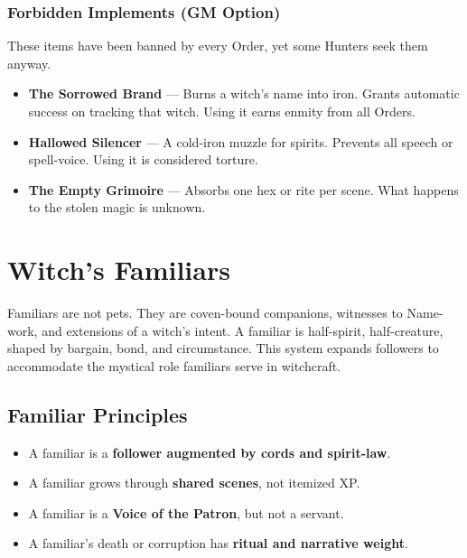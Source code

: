 \documentclass[11pt]{book}
\begin{document}
\subsubsection*{Forbidden Implements (GM Option)}
These items have been banned by every Order, yet some Hunters seek them anyway.

\begin{itemize}[leftmargin=*]
    \item \textbf{The Sorrowed Brand} --- Burns a witch's name into iron.  
          Grants automatic success on tracking that witch.  
          Using it earns enmity from all Orders.

    \item \textbf{Hallowed Silencer} --- A cold-iron muzzle for spirits.  
          Prevents all speech or spell-voice.  
          Using it is considered torture.

    \item \textbf{The Empty Grimoire} --- Absorbs one hex or rite per scene.  
          What happens to the stolen magic is unknown.
\end{itemize}

\section{Witch's Familiars}
\label{sec:familiars}

Familiars are not pets. They are coven-bound companions, witnesses to Name-work,
and extensions of a witch's intent. A familiar is half-spirit, half-creature,
shaped by bargain, bond, and circumstance. This system expands followers to
accommodate the mystical role familiars serve in witchcraft.

\subsection{Familiar Principles}

\begin{itemize}[leftmargin=1.5em]
    \item A familiar is a \textbf{follower augmented by cords and spirit-law}.
    \item A familiar grows through \textbf{shared scenes}, not itemized XP.
    \item A familiar is a \textbf{Voice of the Patron}, but not a servant.
    \item A familiar's death or corruption has \textbf{ritual and narrative weight}.
\end{itemize}
\end{document}
